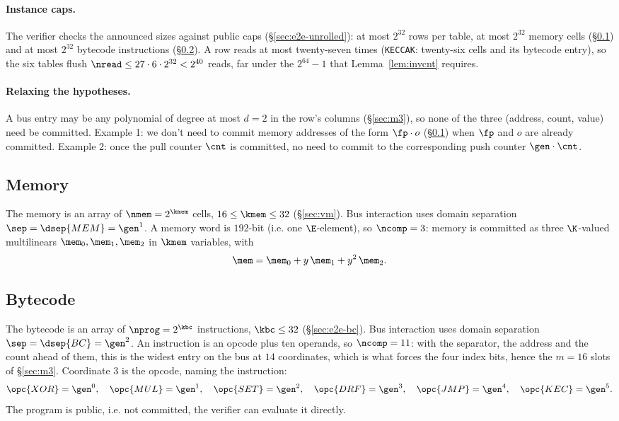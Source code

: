 \paragraph{Instance caps.} The verifier checks the announced sizes against public caps (\S\ref{sec:e2e-unrolled}): at most $2^{32}$ rows per table, at most $2^{32}$ memory cells (\S\ref{sec:memchan}) and at most $2^{32}$ bytecode instructions (\S\ref{sec:bytecode}). A row reads at most twenty-seven times (\texttt{KECCAK}: twenty-six cells and its bytecode entry), so the six tables flush $\nread\le27\cdot6\cdot2^{32}<2^{40}$ reads, far under the $2^{64}-1$ that Lemma~\ref{lem:invcnt} requires.

\paragraph{Relaxing the hypotheses.} A bus entry may be any polynomial of degree at most $d = 2$ in the row's columns (\S\ref{sec:m3}), so none of the three (address, count, value) need be committed. Example 1: we don't need to commit memory addresses of the form $\fp\cdot o$ (\S\ref{sec:memchan}) when $\fp$ and $o$ are already committed. Example 2: once the pull counter $\cnt$ is committed, no need to commit to the corresponding push counter $\gen\cdot\cnt$.

\subsection{Memory}\label{sec:memchan}

The memory is an array of $\nmem = 2^{\kmem}$ cells, $16\le\kmem\le32$ (\S\ref{sec:vm}). Bus interaction uses domain separation $\sep=\dsep{MEM} = \gen^{1}$. A memory word is $192$-bit (i.e. one $\E$-element), so $\ncomp=3$: memory is committed as three $\K$-valued multilinears $\mem_0,\mem_1,\mem_2$ in $\kmem$ variables, with
\[
  \mem=\mem_0+y\,\mem_1+y^2\,\mem_2 .
\]

\subsection{Bytecode}\label{sec:bytecode}

The bytecode is an array of $\nprog = 2^{\kbc}$ instructions, $\kbc \le 32$ (\S\ref{sec:e2e-bc}). Bus interaction uses domain separation $\sep=\dsep{BC} = \gen^{2}$. An instruction is an opcode plus ten operands, so $\ncomp=11$: with the separator, the address and the count ahead of them, this is the widest entry on the bus at $14$ coordinates, which is what forces the four index bits, hence the $m=16$ slots of \S\ref{sec:m3}. Coordinate $3$ is the opcode, naming the instruction:
\[
  \opc{XOR}=\gen^{0},\quad \opc{MUL}=\gen^{1},\quad \opc{SET}=\gen^{2},\quad \opc{DRF}=\gen^{3},\quad \opc{JMP}=\gen^{4},\quad \opc{KEC}=\gen^{5}.
\] The program is public, i.e. not committed, the verifier can evaluate it directly.

